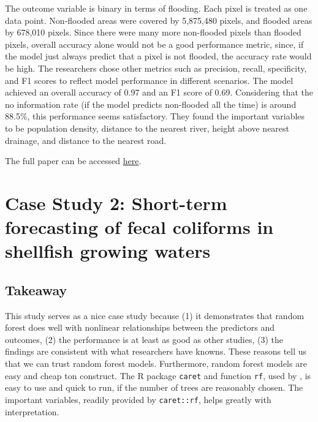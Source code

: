 \documentclass[
]{book}
\begin{document}
The outcome variable is binary in terms of flooding. Each pixel is treated as one data point. Non-flooded areas were covered by 5,875,480 pixels, and flooded areas by 678,010 pixels. Since there were many more non-flooded pixels than flooded pixels, overall accuracy alone would not be a good performance metric, since, if the model just always predict that a pixel is not flooded, the accuracy rate would be high. The researchers chose other metrics such as precision, recall, specificity, and F1 scores to reflect model performance in different scenarios. The model achieved an overall accuracy of 0.97 and an F1 score of 0.69. Considering that the no information rate (if the model predicts non-flooded all the time) is around 88.5\%, this performance seems satisfactory. They found the important variables to be population density, distance to the nearest river, height above nearest drainage, and distance to the nearest road.

The full paper can be accessed \href{https://www.sciencedirect.com/science/article/pii/S1364815223001445?dgcid=author}{here}.

\hypertarget{case-study-2-short-term-forecasting-of-fecal-coliforms-in-shellfish-growing-waters}{%
\section{Case Study 2: Short-term forecasting of fecal coliforms in shellfish growing waters}\label{case-study-2-short-term-forecasting-of-fecal-coliforms-in-shellfish-growing-waters}}

\hypertarget{takeaway-1}{%
\subsection{Takeaway}\label{takeaway-1}}

This study serves as a nice case study because (1) it demonstrates that random forest does well with nonlinear relationships between the predictors and outcomes, (2) the performance is at least as good as other studies, (3) the findings are consistent with what researchers have knowns. These reasons tell us that we can trust random forest models. Furthermore, random forest models are easy and cheap ton construct. The R package \texttt{caret} and function \texttt{rf}, used by \citet{chazal2024}, is easy to use and quick to run, if the number of trees are reasonably chosen. The important variables, readily provided by \texttt{caret::rf}, helps greatly with interpretation.
\end{document}
